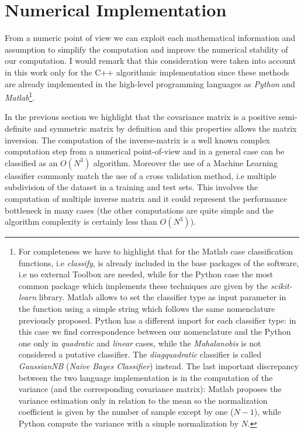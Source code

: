 \documentclass{standalone}
\begin{document}
\section*{Numerical Implementation}

From a numeric point of view we can exploit each mathematical information and assumption to simplify the computation and improve the numerical stability of our computation.
I would remark that this consideration were taken into account in this work only for the C++ algorithmic implementation since these methods are already implemented in the high-level programming languages as \emph{Python} and \emph{Matlab}\footnote{
  For completeness we have to highlight that for the Matlab case classification functions, i.e \emph{classify}, is already included in the base packages of the software, i.e no external Toolbox are needed, while for the Python case the most common package which implements these techniques are given by the \emph{scikit-learn} library.
  Matlab allows to set the classifier type as input parameter in the function using a simple string which follows the same nomenclature previously proposed.
  Python has a different import for each classifier type: in this case we find correspondence between our nomenclature and the Python one only in \emph{quadratic} and \emph{linear} cases, while the \emph{Mahalanobis} is not considered a putative classifier.
  The \emph{diagquadratic} classifier is called \emph{GaussianNB} (\emph{Naive Bayes Classifier}) instead.
  The last important discrepancy between the two language implementation is in the computation of the variance (and the corresponding covariance matrix): Matlab proposes the variance estimation only in relation to the mean so the normalization coefficient is given by the number of sample except by one ($N-1$), while Python compute the variance with a simple normalization by $N$.
}.

In the previous section we highlight that the covariance matrix is a positive semi-definite and symmetric matrix by definition and this properties allows the matrix inversion.
The computation of the inverse-matrix is a well known complex computation step from a numerical point-of-view and in a general case can be classified as an $O(N^3)$ algorithm.
Moreover the use of a Machine Learning classifier commonly match the use of a cross validation method, i.e multiple subdivision of the dataset in a training and test sets.
This involves the computation of multiple inverse matrix and it could represent the performance bottleneck in many cases (the other computations are quite simple and the algorithm complexity is certainly less than $O(N^3)$).
\end{document}
